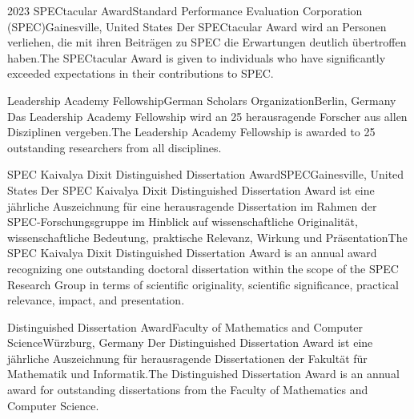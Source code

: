 
\begin{cventries}

    {2023 SPECtacular Award}{Standard Performance Evaluation Corporation (SPEC)}{Gainesville, United States}%
    {} %
    {Der SPECtacular Award wird an Personen verliehen, die mit ihren Beiträgen zu SPEC die Erwartungen deutlich übertroffen haben.}{The SPECtacular Award is given to individuals who have significantly exceeded expectations in their contributions to SPEC.}

	{Leadership Academy Fellowship}{German Scholars Organization}{Berlin, Germany}%
    {}%
    {Das Leadership Academy Fellowship wird an 25 herausragende Forscher aus allen Disziplinen vergeben.}{The Leadership Academy Fellowship is awarded to 25 outstanding researchers from all disciplines.}

	{SPEC Kaivalya Dixit Distinguished Dissertation Award}{SPEC}{Gainesville, United States}%
    {}%
    {Der SPEC Kaivalya Dixit Distinguished Dissertation Award ist eine jährliche Auszeichnung für eine herausragende Dissertation im Rahmen der SPEC-Forschungsgruppe im Hinblick auf wissenschaftliche Originalität, wissenschaftliche Bedeutung, praktische Relevanz, Wirkung und Präsentation}{The SPEC Kaivalya Dixit Distinguished Dissertation Award is an annual award recognizing one outstanding doctoral dissertation within the scope of the SPEC Research Group in terms of scientific originality, scientific significance, practical relevance, impact, and presentation.}

	{Distinguished Dissertation Award}{Faculty of Mathematics and Computer Science}{Würzburg, Germany}%
    {}%
    {Der Distinguished Dissertation Award ist eine jährliche Auszeichnung für herausragende Dissertationen der Fakultät für Mathematik und Informatik.}{The Distinguished Dissertation Award is an annual award for outstanding dissertations from the Faculty of Mathematics and Computer Science.}


\end{cventries}
